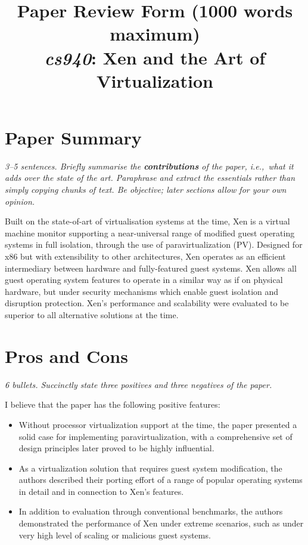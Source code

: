 \documentclass[11pt]{article}
\begin{document}
\title{Paper Review Form (1000 words maximum)\\
  \emph{cs940}: Xen and the Art of Virtualization \cite{barham2003xen}}
\maketitle

\section*{Paper Summary}
\textsl{3--5 sentences. Briefly summarise the {\bf contributions} of the paper, i.e.,~what it adds over the state of the art. Paraphrase and extract the essentials rather than simply copying chunks of text. Be objective; later sections allow for your own opinion.}

Built on the state-of-art of virtualisation systems at the time, Xen is a virtual machine monitor supporting a near-universal range of modified guest operating systems in full isolation, through the use of paravirtualization (PV). Designed for x86 but with extensibility to other architectures, Xen operates as an efficient intermediary between hardware and fully-featured guest systems. Xen allows all guest operating system features to operate in a similar way as if on physical hardware, but under security mechanisms which enable guest isolation and disruption protection. Xen's performance and scalability were evaluated to be superior to all alternative solutions at the time.

\section*{Pros and Cons}
\textsl{6 bullets. Succinctly state three positives and three negatives of the paper.}

I believe that the paper has the following positive features:
\begin{itemize}
	\item Without processor virtualization support at the time, the paper presented a solid case for implementing paravirtualization, with a comprehensive set of design principles later proved to be highly influential. 
	\item As a virtualization solution that requires guest system modification, the authors described their porting effort of a range of popular operating systems in detail and in connection to Xen's features.
	\item In addition to evaluation through conventional benchmarks, the authors demonstrated the performance of Xen under extreme scenarios, such as under very high level of scaling or malicious guest systems.
\end{itemize}
\end{document}
